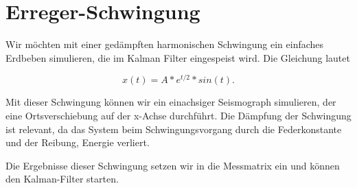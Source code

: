 \documentclass[11pt,a4paper]{article}
\begin{document}
\section{Erreger-Schwingung}
Wir möchten mit einer gedämpften harmonischen Schwingung ein einfaches Erdbeben simulieren, die im Kalman Filter eingespeist wird.
Die Gleichung lautet

\begin{equation}
x(t)=A*e^{t/2}*sin(t).
\end{equation}

Mit dieser Schwingung können wir ein einachsiger Seismograph simulieren, der eine Ortsverschiebung auf der x-Achse durchführt.
Die Dämpfung der Schwingung ist relevant, da das System beim Schwingungsvorgang durch die Federkonstante und der Reibung, Energie verliert.

Die Ergebnisse dieser Schwingung setzen wir in die Messmatrix ein und können den Kalman-Filter starten.
\end{document}
